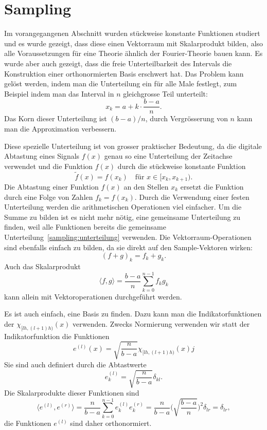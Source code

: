 %
%
%
\section{Sampling%
\label{section:sampling}}
Im vorangegangenen Abschnitt wurden stückweise konstante Funktionen studiert
und es wurde gezeigt, dass diese einen Vektorraum mit Skalarprodukt bilden,
also alle Voraussetzungen für eine Theorie ähnlich der Fourier-Theorie
bauen kann.
Es wurde aber auch gezeigt, dass die freie Unterteilbarkeit des Intervals
die Konstruktion einer orthonormierten Basis erschwert hat.
Das Problem kann gelöst werden, indem man die Unterteilung ein für alle
Male festlegt, zum Beispiel indem man das Interval in $n$ gleichgrosse
Teil unterteilt:
\begin{equation}
x_k = a + k\cdot\frac{b-a}{n}.
\label{sampling:unterteilung}
\end{equation}
Das Korn dieser Unterteilung ist $(b-a)/n$, durch Vergrösserung von $n$
kann man die Approximation verbessern.

Diese spezielle Unterteilung ist von grosser praktischer Bedeutung,
da die digitale Abtastung eines Signals $f(x)$ genau so eine Unterteilung
der Zeitachse verwendet und die Funktion $f(x)$ durch die stückweise
konstante Funktion
\[
\tilde{f} (x) = f(x_k)\quad\text{für $x\in[x_k,x_{k+1})$}.
\]
Die Abtastung einer Funktion $f(x)$ an den Stellen $x_k$ ersetzt
die Funktion durch eine Folge von Zahlen $f_k = f(x_k)$.
Durch die Verwendung einer festen Unterteilung werden die arithmetischen
Operationen viel einfacher.
Um die Summe zu bilden ist es nicht mehr nötig, eine gemeinsame
Unterteilung zu finden, weil alle Funktionen bereits die gemeinsame
Unterteilung~\eqref{sampling:unterteilung} verwenden.
Die Vektorraum-Operationen sind ebenfalls einfach zu bilden,
da sie direkt auf den Sample-Vektoren wirken:
\[
(f+g)_k = f_k + g_k.
\]
Auch das Skalarprodukt 
\[
\langle f,g\rangle
=
\frac{b-a}{n}
\sum_{k=0}^{n-1} f_k g_k
\]
kann allein mit Vektoroperationen durchgeführt werden.

Es ist auch einfach, eine Basis zu finden.
Dazu kann man die Indikatorfunktionen der $\chi_{[lh,(l+1)h)}(x)$
verwenden.
Zwecks Normierung verwenden wir statt der Indikatorfunktion die
Funktionen
\[
e^{(l)}(x) = \sqrt{\frac{n}{b-a}}\chi_{[lh,(l+1)h)}(x)j
\]
Sie sind auch definiert durch die Abtastwerte
\[
e_k^{(l)} = \sqrt{\frac{n}{b-a}}\delta_{kl}.
\]
Die Skalarprodukte dieser Funktionen sind
\[
\langle e^{(l)}, e^{(r)}\rangle
=
\frac{n}{b-a}
\sum_{k=0}^{n-1} e^{(l)}_k e^{(r)}_k
=
\frac{n}{b-a}
\biggl(\sqrt{\frac{b-a}{n}}\biggr)^2 \delta_{lr}
=
\delta_{lr},
\]
die Funktionen $e^{(l)}$ sind daher orthonormiert.

